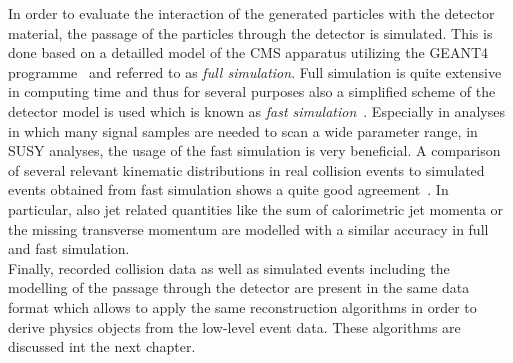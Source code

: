 In order to evaluate the interaction of the generated particles with the detector material, the passage of the particles through the detector is simulated. This is done based on a detailled model of the CMS apparatus utilizing the GEANT4 programme~\cite{Agostinelli2003250} and referred to as \textit{full simulation}. Full simulation is quite extensive in computing time and thus for several purposes also a simplified scheme of the detector model is used which is known as \textit{fast simulation}~\cite{Abdullin:2011zz}. Especially in analyses in which many signal samples are needed to scan a wide parameter range, \eg in SUSY analyses, the usage of the fast simulation is very beneficial. A comparison of several relevant kinematic distributions in real collision events to simulated events obtained from fast simulation shows a quite good agreement~\cite{CMS-DP-2010-039}. In particular, also jet related quantities like the sum of calorimetric jet momenta or the missing transverse momentum are modelled with a similar accuracy in full and fast simulation. \\  
Finally, recorded collision data as well as simulated events including the modelling of the passage through the detector are present in the same data format which allows to apply the same reconstruction algorithms in order to derive physics objects from the low-level event data. These algorithms are discussed int the next chapter.



